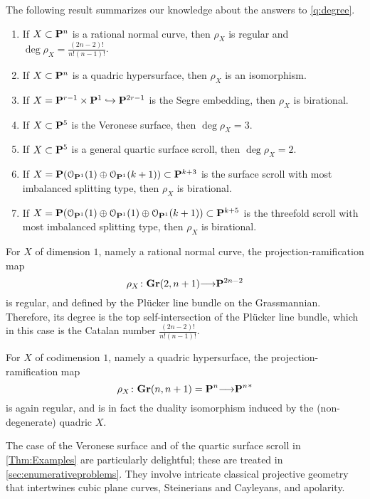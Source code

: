 \documentclass[11pt,reqno]{amsart}
\theoremstyle{plain}
\theoremstyle{definition}
\theoremstyle{remark}
\numberwithin{equation}{section}
\renewcommand{\to}{{\longrightarrow}}
\numberwithin{equation}{section}
\renewcommand{\O}{\mathcal O}
\begin{document}
The following result summarizes our knowledge about the answers to \autoref{q:degree}.
\begin{maintheorem}\label{Thm:Examples}\mbox{}
\begin{enumerate}
  \item If $X \subset \P^{n}$ is a rational normal curve, then $\rho_X$ is regular and $\deg \rho_{X} = \frac{(2n-2)!}{n!(n-1)!}$.
  \item  If $X \subset \P^{n}$ is a quadric hypersurface, then $\rho_{X}$ is an isomorphism.

  \item  If  $X = \P^{r-1} \times \P^{1} \hookrightarrow \P^{2r-1}$ is the Segre embedding, then $ \rho_{X}$ is birational.

  \item  If $X \subset \P^{5}$ is the Veronese surface, then $ \deg \rho_{X} = 3$.
  \item If $X \subset \P^{5}$ is a general quartic surface scroll, then $\deg \rho_{X} = 2$.
  \item If $X = \P(\O_{\P^{1}}(1) \oplus \O_{\P^{1}}(k+1)) \subset \P^{k+3}$ is the surface scroll with most imbalanced splitting type, then $\rho_{X}$ is birational.
  \item If $X = \P(\O_{\P^{1}}(1) \oplus \O_{\P^{1}}(1) \oplus \O_{\P^{1}}(k+1)) \subset \P^{k+5}$ is the threefold scroll with most imbalanced splitting type, then $\rho_{X}$ is birational.
\end{enumerate} 
\end{maintheorem}

For $X$ of dimension $1$, namely a rational normal curve, the projection-ramification map
\[ \rho_X \from \Gr(2, n+1) \to \P^{2n-2}\]
is regular, and defined by the Pl\"ucker line bundle on the Grassmannian.
Therefore, its degree is the top self-intersection of the Pl\"ucker line bundle, which in this case is the Catalan number $\frac{(2n-2)!}{n!(n-1)!}$.

For $X$ of codimension $1$, namely a quadric hypersurface, the projection-ramification map
\[ \rho_X \from \Gr(n, n+1) = \P^{n} \to {\P^n}^* \]
is again regular, and is in fact the duality isomorphism induced by the (non-degenerate) quadric $X$.

The case of the Veronese surface and of the quartic surface scroll in \autoref{Thm:Examples} are particularly delightful; these are treated in \autoref{sec:enumerativeproblems}.
They involve intricate classical projective geometry that intertwines cubic plane curves, Steinerians and Cayleyans, and apolarity.
\end{document}

